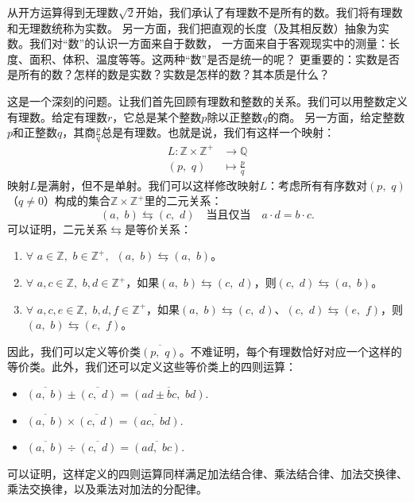 \documentclass[12pt,UTF8]{ctexbook}
\begin{document}
从开方运算得到无理数$\sqrt{2}$开始，我们承认了有理数不是所有的数。我们将有理数和无理数统称为实数。
另一方面，我们把直观的长度（及其相反数）抽象为实数。我们对“数”的认识一方面来自于数数，
一方面来自于客观现实中的测量：长度、面积、体积、温度等等。这两种“数”是否是统一的呢？
更重要的：实数是否是所有的数？怎样的数是实数？实数是怎样的数？其本质是什么？

这是一个深刻的问题。让我们首先回顾有理数和整数的关系。我们可以用整数定义有理数。给定有理数$r$，它总是某个整数$p$除以正整数$q$的商。
另一方面，给定整数$p$和正整数$q$，其商$\frac{p}{q}$总是有理数。也就是说，我们有这样一个映射：
\begin{align*}
    L: \mathbb{Z} \times \mathbb{Z}^+ &\rightarrow \mathbb{Q}  \\
    (p, \,\, q) &\mapsto \frac{p}{q} 
\end{align*}
映射$L$是满射，但不是单射。我们可以这样修改映射$L$：考虑所有有序数对$(p, \,\, q)$（$q\neq 0$）构成的集合$\mathbb{Z} \times \mathbb{Z}^+$里的二元关系：
$$ (a,\,\, b) \leftrightarrows (c, \,\, d)\quad \mbox{当且仅当} \quad a\cdot d = b \cdot c.$$
可以证明，二元关系$\leftrightarrows$是等价关系：
\begin{enumerate}
    \item $\forall \,\, a\in \mathbb{Z}, \,\, b\in\mathbb{Z}^+, \,\,\, (a,\,\, b) \leftrightarrows (a, \,\, b)$。
    \item $\forall \,\, a,c\in \mathbb{Z}, \,\, b,d\in\mathbb{Z}^+$，如果$(a,\,\, b) \leftrightarrows (c, \,\, d)$，则$ (c, \,\, d)\leftrightarrows (a,\,\, b)$。
    \item $\forall \,\, a,c,e\in \mathbb{Z}, \,\, b,d,f\in\mathbb{Z}^+$，如果$(a,\,\, b) \leftrightarrows (c, \,\, d)$、$ (c, \,\, d)\leftrightarrows (e,\,\, f)$，则$(a,\,\, b) \leftrightarrows (e,\,\, f)$。
\end{enumerate}
因此，我们可以定义等价类$\overline{(p,\,\, q)}$。不难证明，每个有理数恰好对应一个这样的等价类。此外，我们还可以定义这些等价类上的四则运算：
\begin{itemize}
    \item $\overline{(a,\,\, b)} \pm \overline{(c, \,\, d)} = \overline{(ad \pm bc, \,\, bd)}.$
    \item $\overline{(a,\,\, b)} \times \overline{(c, \,\, d)} = \overline{(ac, \,\, bd)}.$
    \item $\overline{(a,\,\, b)} \div \overline{(c, \,\, d)} = \overline{(ad, \,\, bc)}.$
\end{itemize}
可以证明，这样定义的四则运算同样满足加法结合律、乘法结合律、加法交换律、乘法交换律，以及乘法对加法的分配律。
\end{document}
